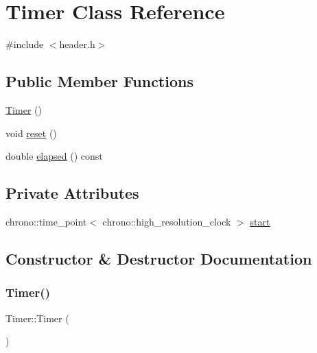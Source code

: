 \hypertarget{class_timer}{}\section{Timer Class Reference}
\label{class_timer}


{\ttfamily \#include $<$header.\+h$>$}

\subsection*{Public Member Functions}
\begin{DoxyCompactItemize}
\item 
\mbox{\hyperlink{class_timer_a5f16e8da27d2a5a5242dead46de05d97}{Timer}} ()
\item 
void \mbox{\hyperlink{class_timer_a9020542d73357a4eef512eefaf57524b}{reset}} ()
\item 
double \mbox{\hyperlink{class_timer_a6a89a613c2af9b0d1e5f7e4ba9e46c54}{elapsed}} () const
\end{DoxyCompactItemize}
\subsection*{Private Attributes}
\begin{DoxyCompactItemize}
\item 
chrono\+::time\+\_\+point$<$ chrono\+::high\+\_\+resolution\+\_\+clock $>$ \mbox{\hyperlink{class_timer_a78c443efac1f9cf716ee8db8b04724c9}{start}}
\end{DoxyCompactItemize}


\subsection{Constructor \& Destructor Documentation}
\mbox{\label{class_timer_a5f16e8da27d2a5a5242dead46de05d97}} 
\subsubsection{\texorpdfstring{Timer()}{Timer()}}
{\footnotesize\ttfamily Timer\+::\+Timer (\begin{DoxyParamCaption}{ }\end{DoxyParamCaption})\hspace{0.3cm}{\ttfamily [inline]}}




